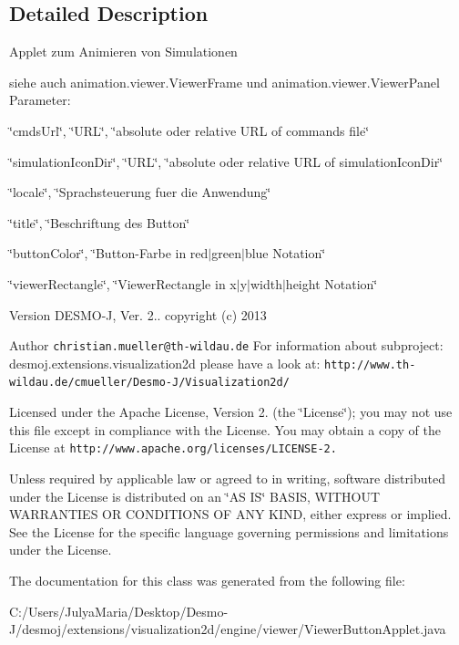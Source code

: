 \subsection{Detailed Description}
Applet zum Animieren von Simulationen\par
 siehe auch animation.\-viewer.\-Viewer\-Frame und animation.\-viewer.\-Viewer\-Panel Parameter\-:\par
 \char`\"{}cmds\-Url\char`\"{}, \char`\"{}\-U\-R\-L\char`\"{}, \char`\"{}absolute oder relative U\-R\-L of commands file\char`\"{}\par
 \char`\"{}simulation\-Icon\-Dir\char`\"{}, \char`\"{}\-U\-R\-L\char`\"{}, \char`\"{}absolute oder relative U\-R\-L of simulation\-Icon\-Dir\char`\"{}\par
 \char`\"{}locale\char`\"{}, \char`\"{}\-Sprachsteuerung fuer die Anwendung\char`\"{}\par
 \char`\"{}title\char`\"{}, \char`\"{}\-Beschriftung des Button\char`\"{}\par
 \char`\"{}button\-Color\char`\"{}, \char`\"{}\-Button-\/\-Farbe in red$|$green$|$blue Notation\char`\"{}\par
 \char`\"{}viewer\-Rectangle\char`\"{}, \char`\"{}\-Viewer\-Rectangle in x$|$y$|$width$|$height Notation\char`\"{}\par


\begin{DoxyVersion}{Version}
D\-E\-S\-M\-O-\/\-J, Ver. 2.. copyright (c) 2013 
\end{DoxyVersion}
\begin{DoxyAuthor}{Author}
{\tt christian.\-mueller@th-\/wildau.\-de} For information about subproject\-: desmoj.\-extensions.\-visualization2d please have a look at\-: {\tt http\-://www.\-th-\/wildau.\-de/cmueller/\-Desmo-\/\-J/\-Visualization2d/}
\end{DoxyAuthor}
Licensed under the Apache License, Version 2. (the \char`\"{}\-License\char`\"{}); you may not use this file except in compliance with the License. You may obtain a copy of the License at {\tt http\-://www.\-apache.\-org/licenses/\-L\-I\-C\-E\-N\-S\-E-\/2.}

Unless required by applicable law or agreed to in writing, software distributed under the License is distributed on an \char`\"{}\-A\-S I\-S\char`\"{} B\-A\-S\-I\-S, W\-I\-T\-H\-O\-U\-T W\-A\-R\-R\-A\-N\-T\-I\-E\-S O\-R C\-O\-N\-D\-I\-T\-I\-O\-N\-S O\-F A\-N\-Y K\-I\-N\-D, either express or implied. See the License for the specific language governing permissions and limitations under the License. 

The documentation for this class was generated from the following file\-:\begin{DoxyCompactItemize}
\item 
C\-:/\-Users/\-Julya\-Maria/\-Desktop/\-Desmo-\/\-J/desmoj/extensions/visualization2d/engine/viewer/Viewer\-Button\-Applet.\-java\end{DoxyCompactItemize}
